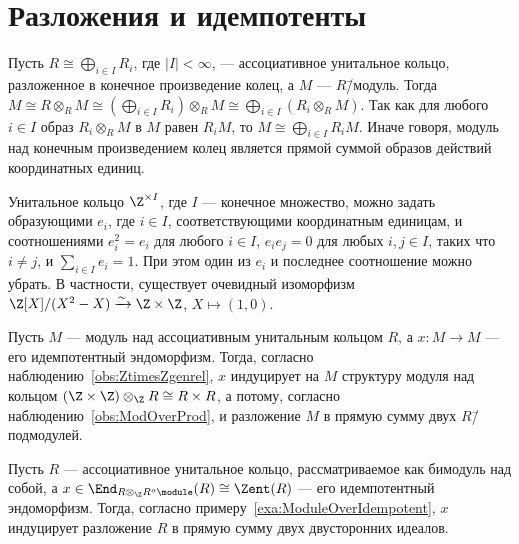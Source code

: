 \documentclass[
	extrafontsizes,
	11pt,
	hyphens,
]{memoir}
\begin{document}
\section{Разложения и идемпотенты}

\begin{observation}
Пусть \(R \cong \bigoplus_{i \in I} R_i\), где \(\lvert I \rvert < \infty\), --- ассоциативное унитальное кольцо, разложенное в конечное произведение колец, а \(M\) --- \(R\)\=/модуль.%
Тогда \(M \cong R \otimes_R M \cong (\bigoplus_{i \in I} R_i) \otimes_R M \cong \bigoplus_{i \in I} (R_i \otimes_R M)\).
Так как для любого \(i \in I\) образ \(R_i \otimes_R M\) в \(M\) равен \(R_i M\), то \(M \cong \bigoplus_{i \in I} R_i M\).
Иначе говоря, модуль над конечным произведением колец является прямой суммой образов действий координатных единиц.
\end{observation}

\begin{observation}
Унитальное кольцо \(\Z^{\times I}\), где \(I\) --- конечное множество, можно задать образующими \(e_i\), где \(i \in I\), соответствующими координатным единицам, и соотношениями \(e_i^2 = e_i\) для любого \(i \in I\), \(e_i e_j = 0\) для любых \(i,j \in I\), таких что \(i \neq j\), и \(\sum_{i \in I} e_i = 1\).%
\label{obs:ZtimesZgenrel}
При этом один из \(e_i\) и последнее соотношение можно убрать.
В частности, существует очевидный изоморфизм
\(\Z[X] / (X^2 - X) \xrightarrow{\sim} \Z \times \Z\), \(X \mapsto (1,0)\).
\end{observation}

\begin{example}
Пусть \(M\) --- модуль над ассоциативным унитальным кольцом \(R\), а \(x : M \to M\) --- его идемпотентный эндоморфизм.%
\label{exa:ModuleOverIdempotent}
Тогда, согласно наблюдению~\ref{obs:ZtimesZgenrel}, \(x\) индуцирует на \(M\) структуру модуля над кольцом \((\Z \times \Z) \otimes_{\Z} R \cong R \times R\), а потому, согласно наблюдению~\ref{obs:ModOverProd}, и разложение \(M\) в прямую сумму двух \(R\)\=/подмодулей.
\end{example}

\begin{example}
Пусть \(R\) --- ассоциативное унитальное кольцо, рассматриваемое как бимодуль над собой, а \(x \in \End_{R \otimes_{\Z} R^o\module}(R) \cong \Zent(R)\) --- его идемпотентный эндоморфизм. Тогда, согласно примеру~\ref{exa:ModuleOverIdempotent}, \(x\) индуцирует разложение \(R\) в прямую сумму двух двусторонних идеалов.
\end{example}
\end{document}
